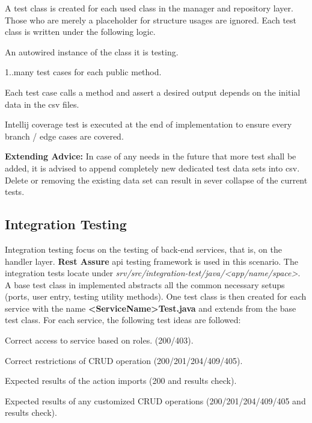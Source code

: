 \bigskip
A test class is created for each used class in the manager and repository layer. Those who are merely a placeholder for structure usages are ignored. Each test class is written under the following logic.

\begin{compactenum}
	\item An autowired instance of the class it is testing.
    \item 1..many test cases for each public method.
    \item Each test case calls a method and assert a desired output depends on the initial data in the csv files.
    \item Intellij coverage test is executed at the end of implementation to ensure every branch / edge cases are covered.
\end{compactenum}

\bigskip
\textbf{Extending Advice:} In case of any needs in the future that more test shall be added, it is advised to append completely new dedicated test data sets into csv. Delete or removing the existing data set can result in sever collapse of the current tests.

\subsection{Integration Testing}
Integration testing focus on the testing of back-end services, that is, on the handler layer. \textbf{Rest Assure} api testing framework is used in this scenario.
The integration tests locate under \textit{srv/src/integration-test/java/<app/name/space>}. A base test class in implemented abstracts all the common necessary setups (ports, user entry, testing utility methods). One test class is then created for each service with the name \textbf{<ServiceName>Test.java} and extends from the base test class. For each service, the following test ideas are followed:
\begin{compactenum}
	\item Correct access to service based on roles. (200/403).
    \item Correct restrictions of CRUD operation (200/201/204/409/405).
    \item Expected results of the action imports (200 and results check).
    \item Expected results of any customized CRUD operations (200/201/204/409/405 and results check).
\end{compactenum}

